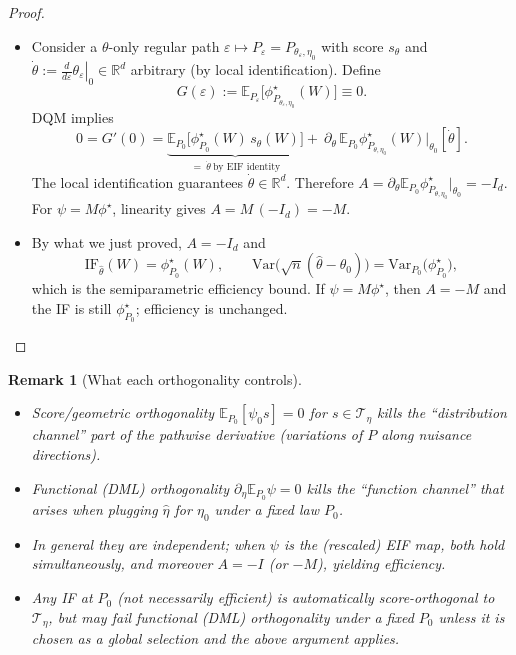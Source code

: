 \documentclass[12pt]{article}
\renewcommand{\(}{\left(}%
\renewcommand{\)}{\right)}%
\renewcommand{\[}{\left[}%
\renewcommand{\]}{\right]}%
\renewcommand{\r}{\mathbb{R}}
\newtheorem{remark}{Remark}[section]}
\newtheorem{proof}{Proof.}}
\begin{document}
\begin{proof}
\begin{itemize}
    \item Consider a $\theta$-only regular path $\varepsilon\mapsto P_\varepsilon=P_{\theta_\varepsilon,\eta_0}$ with score $s_\theta$ and $\dot\theta:=\left.\tfrac{d}{d\varepsilon}\theta_\varepsilon\right|_{0}\in\mathbb R^d$ arbitrary (by local identification). Define
\begin{equation*}
G(\varepsilon):=\mathbb E_{P_\varepsilon}\big[\phi^\star_{P_{\theta_\varepsilon,\eta_0}}(W)\big]\equiv 0.
\end{equation*}
DQM implies
\begin{equation*}
0=G'(0)=\underbrace{\mathbb E_{P_0}\big[\phi^\star_{P_0}(W)\,s_\theta(W)\big]}_{=\ \dot\theta\ \text{by EIF identity}}
+\ \partial_\theta\,\mathbb E_{P_0}\phi^\star_{P_{\theta,\eta_0}}(W)\big|_{\theta_0}[\dot\theta].
\end{equation*}
The local identification guarantees $\dot\theta\in \r^d$. Therefore $A=\partial_\theta \mathbb E_{P_0}\phi^\star_{P_{\theta,\eta_0}}|_{\theta_0}=-I_d$.
For $\psi=M\phi^\star$, linearity gives $A=M\,(-I_d)=-M$.
    \item By what we just proved, $A=-I_d$ and
\begin{equation*}
\mathrm{IF}_{\hat\theta}(W)=\phi^\star_{P_0}(W),\qquad
\mathrm{Var}\big(\sqrt n(\hat\theta-\theta_0)\big)=\mathrm{Var}_{P_0}\big(\phi^\star_{P_0}\big),
\end{equation*}
which is the semiparametric efficiency bound.
If $\psi=M\phi^\star$, then $A=-M$ and the IF is still $\phi^\star_{P_0}$; efficiency is unchanged.
\end{itemize}
\end{proof}


\begin{remark}[What each orthogonality controls]
\
\begin{itemize}
\item \emph{Score/geometric orthogonality} $\mathbb E_{P_0}[\psi_0 s]=0$ for $s\in\mathcal T_\eta$ kills the ``distribution channel'' part of the pathwise derivative (variations of $P$ along nuisance directions).
\item \emph{Functional (DML) orthogonality} $\partial_\eta \mathbb E_{P_0}\psi=0$ kills the ``function channel'' that arises when plugging $\hat\eta$ for $\eta_0$ under a fixed law $P_0$.
\item In general they are independent; when $\psi$ is the (rescaled) \emph{EIF map}, both hold simultaneously, and moreover $A=-I$ (or $-M$), yielding efficiency.
\item Any IF at $P_0$ (not necessarily efficient) is automatically score-orthogonal to $\mathcal T_\eta$, but may fail functional (DML) orthogonality under a fixed $P_0$ unless it is chosen as a global selection and the above argument applies.
\end{itemize}
\end{remark}
\end{document}
